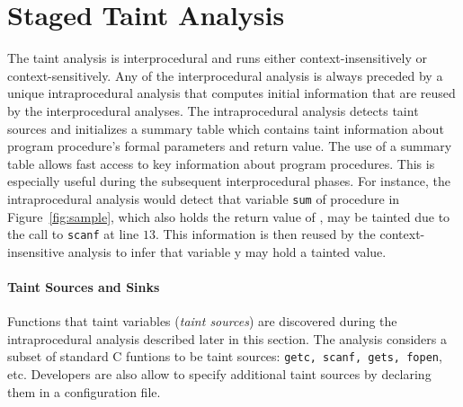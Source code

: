 \section{Staged Taint Analysis}\label{sec:analysis}

\newcommand{\varset}{\mathit{Var}\xspace}
\newcommand{\instset}{\mathit{Inst}\xspace}
\newcommand{\procset}{\mathit{Proc}\xspace}
\newcommand{\formalsset}{\mathit{formals}\xspace}
\newcommand{\aliases}{\mathit{aliases}\xspace}
\newcommand{\intset}{\mathbb{N}^+}
\newcommand{\firstfunc}{\mathit{first}}
\newcommand{\toplevelfunc}{\mathit{toplevel}}
\newcommand{\taintfunc}{\mathit{taint}}
\newcommand{\pointsto}[2]{{pt}_{[#1]}(#2)}
\newcommand{\pointstobefore}[2]{{pt}_{[\overline{#1}]	}(#2)}
\newcommand{\pointstoafter}[2]{{pt}_{[\underline{#1}]}(#2)}

\newcommand{\myinflow}{\mathit{IN}}
\newcommand{\myoutflow}{\mathit{OUT}}
\newcommand{\ifff}{\mathit{iff}}
\newcommand{\aand}{\mathit{and}}
\newcommand{\mybigcup}[2]{\mathlarger{\bigcup_{#1}^{#2}}}

The taint analysis is interprocedural and runs
either context-insensitively or context-sensitively.
Any of the interprocedural analysis is always preceded
by a unique intraprocedural analysis that computes initial
information that are reused by the interprocedural analyses.
The intraprocedural analysis detects taint sources and
initializes a summary table which contains taint information
about program procedure's formal parameters and return value.
The use of a summary table allows fast access to key
information about program procedures. This is especially
useful during the subsequent interprocedural phases.
For instance, the intraprocedural analysis would
detect that variable \texttt{sum} of procedure \compute{} in
Figure~\ref{fig:sample}, which also holds the return
value of \compute{}, may be tainted due to the call
to \texttt{scanf} at line $13$. This information is then
reused by the context-insensitive analysis to infer that
variable y may hold a tainted value.

\paragraph{Taint Sources and Sinks}
Functions that taint variables (\textit{taint sources}) are discovered
during the intraprocedural analysis described later in this section.
The analysis considers a subset of standard C funtions to be taint sources:
{\tt getc, scanf, gets, fopen}, etc.
Developers are also allow to specify additional taint sources
by declaring them in a configuration file.

